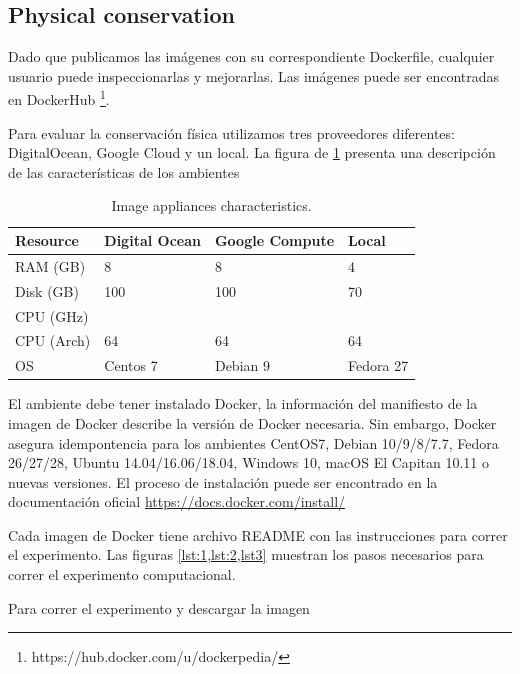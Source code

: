 \subsection{Physical conservation}\label{s5.2}

Dado que publicamos las imágenes con su correspondiente Dockerfile, cualquier usuario puede inspeccionarlas y mejorarlas. Las imágenes puede ser encontradas en DockerHub \footnote{https://hub.docker.com/u/dockerpedia/}. 

Para evaluar la conservación física utilizamos tres proveedores diferentes: DigitalOcean, Google Cloud y un local. La figura de \ref{image-env} presenta una descripción de las características de los ambientes    

\begin{table}[]
\begin{tabular}{|l|l|l|l|}
\hline
Resource   & Digital Ocean & Google Compute & Local     \\ \hline
RAM (GB)   & 8             & 8              & 4         \\ \hline
Disk (GB)  & 100           & 100            & 70        \\ \hline
CPU (GHz)  &               &                &           \\ \hline
CPU (Arch) & 64            & 64             & 64        \\ \hline
OS         & Centos 7      & Debian 9       & Fedora 27 \\ \hline
\end{tabular}
\caption{Image appliances characteristics.}
\label{image-env}
\end{table}

El ambiente debe tener instalado Docker, la información del manifiesto de la imagen de Docker describe la versión de Docker necesaria. Sin embargo, Docker asegura idempontencia para los ambientes CentOS7, Debian 10/9/8/7.7, Fedora 26/27/28, Ubuntu 14.04/16.06/18.04, Windows 10, macOS El Capitan 10.11 o nuevas versiones. El proceso de instalación puede ser encontrado en la documentación oficial \url{https://docs.docker.com/install/}

Cada imagen de Docker tiene archivo README con las instrucciones para correr el experimento. Las figuras \ref{lst:1,lst:2,lst3}  muestran los pasos necesarios para correr el experimento computacional. 

Para correr el experimento y descargar la imagen


